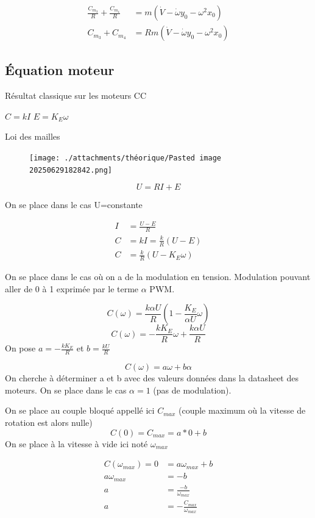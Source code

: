 \documentclass[a4paper,12pt]{report}  %
\begin{document}
\begin{align*}
	\frac{C_{m_3}}{R} + \frac{C_{m_4}}{R} &= m(\dot{V} - \dot{\omega} y_0 - \omega^2 x_0) \\
	C_{m_3} + C_{m_4} &= Rm(\dot{V} - \dot{\omega} y_0 - \omega^2 x_0)
\end{align*}



\subsection{Équation moteur} 
Résultat classique sur les moteurs CC

$C = kI$      $E=K_{E}\omega$

Loi des mailles 
\begin{figure}[H]
	\centering
	\texttt{[image: ./attachments/théorique/Pasted image 20250629182842.png]}
	\caption{}
\end{figure}


$$
U = RI + E
$$

On se place dans le cas U=constante




\begin{align*}    
	I &= \frac{U-E}{R} \\
	C &= kI = \frac{k}{R}(U-E) \\
	C &= \frac{k}{R}(U-K_{E}\omega)
\end{align*}






On se place dans le cas où on a de la modulation en tension. Modulation pouvant aller de 0 à 1 exprimée par le terme $\alpha$ PWM. 



$$
C(\omega) = \frac{k \alpha U}{R} (1 - \frac{K_E}{\alpha U} \omega)
$$
$$
C(\omega) = - \frac{k K_E}{R} \omega + \frac{k \alpha U}{R} 
$$
On pose $a =- \frac{k K_E}{R}$ et $b=\frac{k  U}{R}$ 

$$
C(\omega) = a\omega + b\alpha 
$$
On cherche à déterminer a et b avec des valeurs données dans la datasheet des moteurs.
On se place dans le cas $\alpha = 1$ (pas de modulation).

On se place au couple bloqué appellé ici $C_{max}$ (couple maximum où la vitesse de rotation est alors nulle)
$$
C(0) = C_{max} = a*0 + b
$$
On se place à la vitesse à vide ici noté $\omega_{max}$ 

\begin{align*}
	C(\omega_{max}) = 0 &= a\omega_{max} + b \\
	a\omega_{max} &= -b \\
	a &= \frac{-b}{\omega_{max}} \\
	a &= -\frac{C_{max}}{\omega_{max}}
\end{align*}
\end{document}
